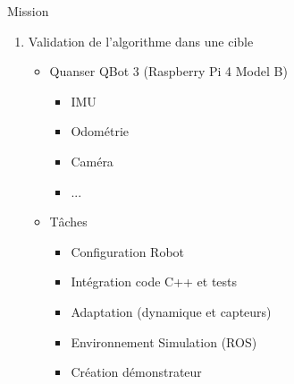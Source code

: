 \documentclass[aspectratio=169]{neocampus}
\begin{document}
\begin{frame}{Mission}
  \begin{minipage}[c]{.6\textwidth}
    \begin{enumerate}
      \item Validation de l'algorithme dans une cible
            \begin{itemize}
              \item Quanser QBot 3 (Raspberry Pi 4 Model B)
                    \begin{itemize}
                      \item IMU
                      \item Odométrie
                      \item Caméra
                      \item ...
                    \end{itemize}
              \item Tâches
                    \begin{itemize}
                      \item Configuration Robot
                      \item Intégration code C++ et tests
                      \item Adaptation (dynamique et capteurs)
                      \item Environnement Simulation (ROS)
                      \item Création démonstrateur
                    \end{itemize}
            \end{itemize}
    \end{enumerate}
  \end{minipage}
  \hfill
  \begin{minipage}[c]{.3\textwidth}
  \end{minipage}
\end{frame}
\end{document}
